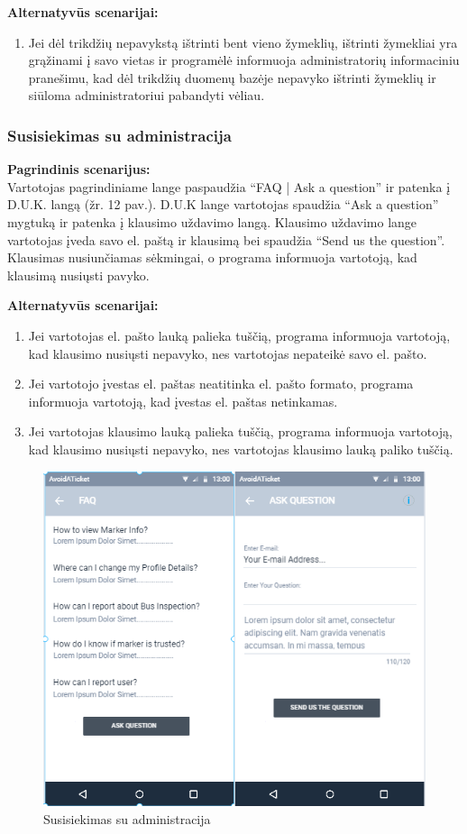 \documentclass{VUMIFPSkursinis}
\begin{document}
	\textbf{Alternatyvūs scenarijai:}
	\begin{enumerate}[itemsep=-2mm]
		\item Jei dėl trikdžių nepavykstą ištrinti bent vieno žymeklių, ištrinti žymekliai yra grąžinami į savo vietas ir programėlė informuoja administratorių informaciniu pranešimu, kad dėl trikdžių duomenų bazėje nepavyko ištrinti žymeklių ir siūloma administratoriui pabandyti vėliau.
	\end{enumerate} 

\subsubsection{Susisiekimas su administracija}
	\textbf{Pagrindinis scenarijus:}\\
	Vartotojas pagrindiniame lange paspaudžia “FAQ | Ask a question” ir patenka į D.U.K. langą (žr. 12 pav.). D.U.K lange vartotojas 
	spaudžia “Ask a question” mygtuką ir patenka į klausimo uždavimo langą. Klausimo uždavimo lange vartotojas įveda 
	savo el. paštą ir klausimą bei spaudžia “Send us the question”. Klausimas nusiunčiamas sėkmingai, o programa informuoja 
	vartotoją, kad klausimą nusiųsti pavyko.

	\textbf{Alternatyvūs scenarijai:}
	\begin{enumerate}[itemsep=-2mm]
		\item Jei vartotojas el. pašto lauką palieka tuščią, programa informuoja vartotoją, kad klausimo nusiųsti nepavyko, nes vartotojas nepateikė savo el. pašto.
		\item Jei vartotojo įvestas el. paštas neatitinka el. pašto formato, programa informuoja vartotoją, kad įvestas el. paštas netinkamas.
		\item Jei vartotojas klausimo lauką palieka tuščią, programa informuoja vartotoją, kad klausimo nusiųsti nepavyko, nes vartotojas klausimo lauką paliko tuščią.
	\end{enumerate} 
	\begin{figure}[H]
				\centering
				\includegraphics[scale=1.4]{img/mockup_admincomunication}
				\caption{Susisiekimas su administracija}
				\label{img:Susisiekimas su administracija}
			\end{figure}
\end{document}
